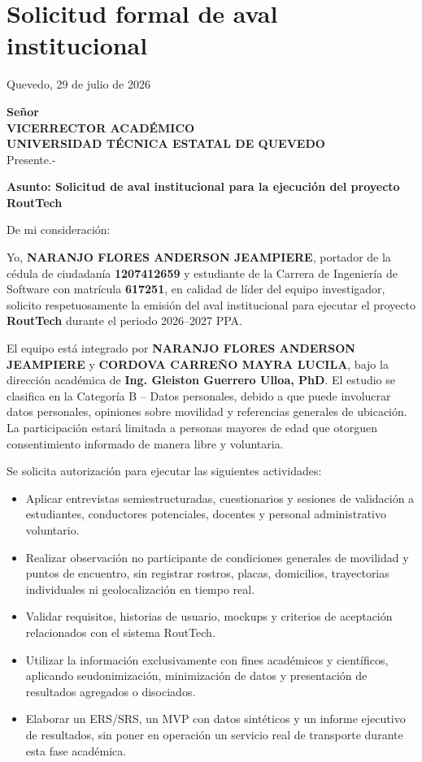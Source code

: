 \documentclass[11pt,a4paper]{article}
\newcommand{\Periodo}{2026--2027 PPA}
\newcommand{\CategoriaEtica}{Categoría B -- Datos personales}
\newcommand{\Docente}{Ing. Gleiston Guerrero Ulloa, PhD}
\newcommand{\Anderson}{NARANJO FLORES ANDERSON JEAMPIERE}
\newcommand{\CedulaAnderson}{1207412659}
\newcommand{\MatriculaAnderson}{617251}
\newcommand{\Mayra}{CORDOVA CARREÑO MAYRA LUCILA}
\begin{document}
\section{Solicitud formal de aval institucional}


\small
\vspace{0.15cm}
\begin{flushright}
Quevedo, 29 de julio de 2026
\end{flushright}

\textbf{Señor}\\
\textbf{VICERRECTOR ACADÉMICO}\\
\textbf{UNIVERSIDAD TÉCNICA ESTATAL DE QUEVEDO}\\
Presente.-

\textbf{Asunto: Solicitud de aval institucional para la ejecución del proyecto RoutTech}

De mi consideración:

\begin{sloppypar}
Yo, \textbf{\Anderson}, portador de la cédula de ciudadanía \textbf{\CedulaAnderson} y estudiante de la Carrera de Ingeniería de Software con matrícula \textbf{\MatriculaAnderson}, en calidad de líder del equipo investigador, solicito respetuosamente la emisión del aval institucional para ejecutar el proyecto \textbf{RoutTech} durante el periodo \Periodo.
\end{sloppypar}

El equipo está integrado por \textbf{\Anderson} y \textbf{\Mayra}, bajo la dirección académica de \textbf{\Docente}. El estudio se clasifica en la \CategoriaEtica, debido a que puede involucrar datos personales, opiniones sobre movilidad y referencias generales de ubicación. La participación estará limitada a personas mayores de edad que otorguen consentimiento informado de manera libre y voluntaria.

Se solicita autorización para ejecutar las siguientes actividades:

\begin{itemize}
  \item Aplicar entrevistas semiestructuradas, cuestionarios y sesiones de validación a estudiantes, conductores potenciales, docentes y personal administrativo voluntario.
  \item Realizar observación no participante de condiciones generales de movilidad y puntos de encuentro, sin registrar rostros, placas, domicilios, trayectorias individuales ni geolocalización en tiempo real.
  \item Validar requisitos, historias de usuario, mockups y criterios de aceptación relacionados con el sistema RoutTech.
  \item Utilizar la información exclusivamente con fines académicos y científicos, aplicando seudonimización, minimización de datos y presentación de resultados agregados o disociados.
  \item Elaborar un ERS/SRS, un MVP con datos sintéticos y un informe ejecutivo de resultados, sin poner en operación un servicio real de transporte durante esta fase académica.
\end{itemize}
\end{document}
